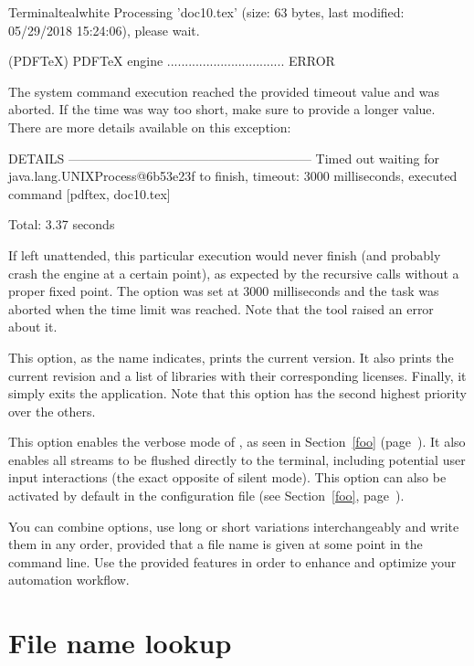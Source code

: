 \begin{description}
\begin{codebox}{Terminal}{teal}{\icnote}{white}
Processing 'doc10.tex' (size: 63 bytes, last modified: 05/29/2018
15:24:06), please wait.

(PDFTeX) PDFTeX engine .................................   ERROR

The system command execution reached the provided timeout value
and was aborted. If the time was way too short, make sure to
provide a longer value. There are more details available on this
exception:

DETAILS ---------------------------------------------------------
Timed out waiting for java.lang.UNIXProcess@6b53e23f to finish,
timeout: 3000 milliseconds, executed command [pdftex, doc10.tex]

Total: 3.37 seconds
\end{codebox}

If left unattended, this particular execution would never finish (and probably crash the engine at a certain point), as expected by the recursive calls without a proper fixed point. The  option was set at 3000 milliseconds and the task was aborted when the time limit was reached. Note that the tool raised an error about it.

\item[\describeop{V}{version}] This option, as the name indicates, prints the current version. It also prints the current revision and a list of libraries with their corresponding licenses. Finally, it simply exits the application. Note that this option has the second highest priority over the others.

\item[\describeop{v}{verbose}] This option enables the verbose mode of \arara, as seen in Section~\ref{foo} (page~\pageref{foo}). It also enables all streams to be flushed directly to the terminal, including potential user input interactions (the exact opposite of silent mode). This option can also be activated by default in the configuration file (see Section~\ref{foo}, page~\pageref{foo}).
\end{description}

You can combine options, use long or short variations interchangeably and write them in any order, provided that a file name is given at some point in the command line. Use the provided features in order to enhance and optimize your automation workflow.

\section{File name lookup}
\label{sec:filenamelookup}

